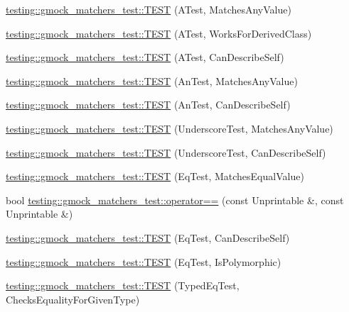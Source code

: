\begin{DoxyCompactItemize}
\item 
\hyperlink{namespacetesting_1_1gmock__matchers__test_af15da53cdc65283b8ca688a03801fd12}{testing\+::gmock\+\_\+matchers\+\_\+test\+::\+T\+E\+ST} (A\+Test, Matches\+Any\+Value)
\item 
\hyperlink{namespacetesting_1_1gmock__matchers__test_a2b2dfb85d18883b07f7d13d21abee2fc}{testing\+::gmock\+\_\+matchers\+\_\+test\+::\+T\+E\+ST} (A\+Test, Works\+For\+Derived\+Class)
\item 
\hyperlink{namespacetesting_1_1gmock__matchers__test_a24432bc861bee430fb8ac1a4e5463ecf}{testing\+::gmock\+\_\+matchers\+\_\+test\+::\+T\+E\+ST} (A\+Test, Can\+Describe\+Self)
\item 
\hyperlink{namespacetesting_1_1gmock__matchers__test_a15bf6771986d1e9f675f29861f7551c1}{testing\+::gmock\+\_\+matchers\+\_\+test\+::\+T\+E\+ST} (An\+Test, Matches\+Any\+Value)
\item 
\hyperlink{namespacetesting_1_1gmock__matchers__test_ac3b18688ca5b5cf2d6137ce3e7397691}{testing\+::gmock\+\_\+matchers\+\_\+test\+::\+T\+E\+ST} (An\+Test, Can\+Describe\+Self)
\item 
\hyperlink{namespacetesting_1_1gmock__matchers__test_a3fc77fa5ca709ef70963026fd7114552}{testing\+::gmock\+\_\+matchers\+\_\+test\+::\+T\+E\+ST} (Underscore\+Test, Matches\+Any\+Value)
\item 
\hyperlink{namespacetesting_1_1gmock__matchers__test_a25ae831c15c9ca918ed847ba147ac572}{testing\+::gmock\+\_\+matchers\+\_\+test\+::\+T\+E\+ST} (Underscore\+Test, Can\+Describe\+Self)
\item 
\hyperlink{namespacetesting_1_1gmock__matchers__test_a2ac5d4c2fae3e7f2e6c6be657a61f86a}{testing\+::gmock\+\_\+matchers\+\_\+test\+::\+T\+E\+ST} (Eq\+Test, Matches\+Equal\+Value)
\item 
bool \hyperlink{namespacetesting_1_1gmock__matchers__test_a4b9f261a3b98ba0e0bca21b69d593241}{testing\+::gmock\+\_\+matchers\+\_\+test\+::operator==} (const Unprintable \&, const Unprintable \&)
\item 
\hyperlink{namespacetesting_1_1gmock__matchers__test_a1c86e845cb44f34eeac4863041c871c6}{testing\+::gmock\+\_\+matchers\+\_\+test\+::\+T\+E\+ST} (Eq\+Test, Can\+Describe\+Self)
\item 
\hyperlink{namespacetesting_1_1gmock__matchers__test_ac3ea755ba2a8bb480cee70aa37ccafc2}{testing\+::gmock\+\_\+matchers\+\_\+test\+::\+T\+E\+ST} (Eq\+Test, Is\+Polymorphic)
\item 
\hyperlink{namespacetesting_1_1gmock__matchers__test_a3e8d6cc259c1410a85572bc773bb21b9}{testing\+::gmock\+\_\+matchers\+\_\+test\+::\+T\+E\+ST} (Typed\+Eq\+Test, Checks\+Equality\+For\+Given\+Type)

\end{DoxyCompactItemize}
